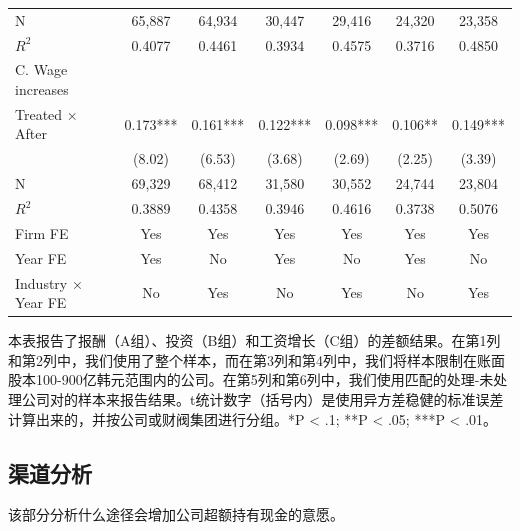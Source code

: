 \documentclass{article}
\begin{document}
\begin{table}[H]
\begin{tabular}{lcccccc}
N                    & 65,887        & 64,934        & 30,447               & 29,416               & 24,320       & 23,358       \\
$R^2$                   & 0.4077        & 0.4461        & 0.3934               & 0.4575               & 0.3716       & 0.4850       \\ \midrule
C. Wage   increases  &               &               &                      &                      &              &              \\ \midrule
Treated ×   After    & 0.173***      & 0.161***      & 0.122***             & 0.098***             & 0.106**      & 0.149***     \\
                     & (8.02)        & (6.53)        & (3.68)               & (2.69)               & (2.25)       & (3.39)       \\
N                    & 69,329        & 68,412        & 31,580               & 30,552               & 24,744       & 23,804       \\
$R^2$                   & 0.3889        & 0.4358        & 0.3946               & 0.4616               & 0.3738       & 0.5076       \\
Firm FE              & Yes           & Yes           & Yes                  & Yes                  & Yes          & Yes          \\
Year FE              & Yes           & No            & Yes                  & No                   & Yes          & No           \\
Industry ×   Year FE & No            & Yes           & No                   & Yes                  & No           & Yes          \\ \bottomrule
\end{tabular}
\begin{tablenotes}
\footnotesize
    \item 本表报告了报酬（A组）、投资（B组）和工资增长（C组）的差额结果。在第1列和第2列中，我们使用了整个样本，而在第3列和第4列中，我们将样本限制在账面股本100-900亿韩元范围内的公司。在第5列和第6列中，我们使用匹配的处理-未处理公司对的样本来报告结果。t统计数字（括号内）是使用异方差稳健的标准误差计算出来的，并按公司或财阀集团进行分组。*P < .1; **P < .05; ***P < .01。
\end{tablenotes}
\end{table}

\subsection{渠道分析}
该部分分析什么途径会增加公司超额持有现金的意愿。
\end{document}
